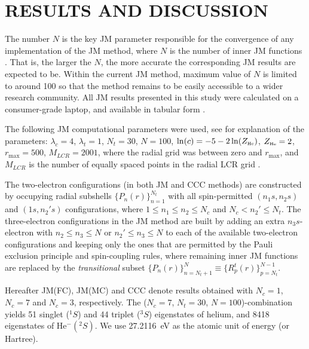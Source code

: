\documentclass[aip
, pra
, showpacs
, aps
, twocolumn
, groupedaddress
, floatfix
]{revtex4}
\begin{document}
\section{RESULTS AND DISCUSSION}


The number $N$ is the key JM parameter responsible for the convergence of any implementation of the JM method,
where $N$ is the number of inner JM functions \cite{HY74p1201,BR76p1491}.
That is, the larger the $N$, the more accurate the corresponding JM results are expected to be.
Within the current JM method, maximum value of $N$ is limited to around 100 so that the method remains to be easily accessible
to a wider research community. All JM results presented in this study were calculated on a consumer-grade laptop,
and available in tabular form \cite{JMatrixWebsite}.


The following JM computational parameters were used, see \cite{KB10p022708} for explanation of the parameters:
$\lambda_c=4$, $\lambda_t=1$, $N_t=30$, $N=100$, $\ln(c)=-5 - 2\ln(Z_{\mbox{\tiny{He}}} )$, $Z_{\mbox{\tiny{He}}}=2$, $r_{\max}=500$,
$M_{LCR}=2001$, where the radial grid was between zero and $r_{\max}$, and
$M_{LCR}$ is the number of equally spaced points in the radial LCR grid \cite{KB10p022708}.


The two-electron configurations (in both JM and CCC methods) are constructed by occupying  radial subshells $\{P_n(r)\}_{n=1}^{N_t}$
with all spin-permitted $(n_1s,n_2s)$ and $(1s,n_2's)$ configurations,
where $1 \leq n_1 \leq n_2 \leq N_c$ and $N_c<n_2' \leq N_t$.
The three-electron configurations 
in the JM method are built by adding an extra $n_3s$-electron with
$ n_2 \leq n_3 \leq N$ or $ n_2' \leq n_3 \leq N$ to each of the available two-electron configurations
and keeping only the ones that are permitted by the Pauli exclusion principle and spin-coupling rules,
where remaining inner JM functions are replaced by the {\em transitional} \cite{KFB11} subset $\{P_n(r)\}_{n=N_t+1}^{N} \equiv \{R^t_p(r)\}_{p=N_t}^{N-1}$.


Hereafter JM(FC), JM(MC) and CCC denote results obtained with $N_c=1$, $N_c=7$ and $N_c=3$, respectively.
The ($N_c=7$, $N_t=30$, $N=100$)-combination yields 51 singlet ($^1S$) and 44 triplet ($^3S$) eigenstates of helium, and 8418 eigenstates of He$^-(^2S)$.
We use 27.2116~eV as the atomic unit of energy (or Hartree).
\end{document}
